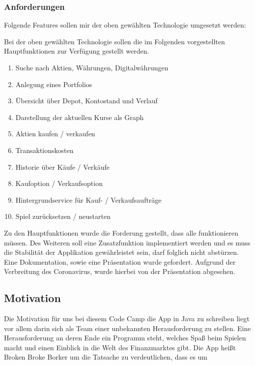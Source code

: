 \documentclass[10pt]{scrartcl}
\begin{document}
\subsubsection{Anforderungen}
Folgende Features sollen mir der oben gewählten Technologie umgesetzt werden:

Bei der oben gewählten Technologie sollen die im Folgenden vorgestellten Hauptfunktionen zur Verfügung gestellt werden.

\begin{enumerate}
	\item 
	Suche nach Aktien, Währungen, Digitalwährungen
	\item
	Anlegung eines Portfolios
	\item
	Übersicht über Depot, Kontostand und Verlauf
	\item
	Darstellung der aktuellen Kurse als Graph
	\item
	Aktien kaufen / verkaufen
	\item
	Transaktionskosten
	\item
	Historie über Käufe / Verkäufe
	\item
	Kaufoption / Verkaufsoption
	\item
	Hintergrundservice für Kauf- / Verkaufsaufträge
	\item
	Spiel zurücksetzen / neustarten
\end{enumerate}


Zu den Hauptfunktionen wurde die Forderung gestellt, dass alle funktionieren müssen. Des Weiteren soll eine Zusatzfunktion implementiert werden und es muss die Stabilität der Applikation gewährleistet sein, darf folglich nicht abstürzen. Eine Dokumentation, sowie eine Präsentation wurde gefordert. Aufgrund der Verbreitung des Coronavirus, wurde hierbei von der Präsentation abgesehen.



\subsection{Motivation}
Die Motivation für uns bei diesem Code Camp die App in Java zu schreiben liegt vor allem darin sich als Team einer unbekannten Herausforderung zu stellen. Eine Herausforderung an deren Ende ein Programm steht, welches Spaß beim Spielen macht und einen Einblick in die Welt des Finanzmarktes gibt. Die App heißt Broken Broke Borker um die Tatsache zu verdeutlichen, dass es um 
\end{document}
